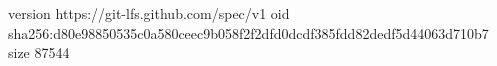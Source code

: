 version https://git-lfs.github.com/spec/v1
oid sha256:d80e98850535c0a580ceec9b058f2f2dfd0dcdf385fdd82dedf5d44063d710b7
size 87544
